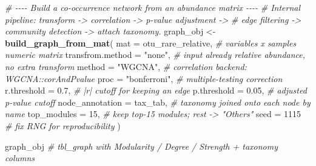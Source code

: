 \documentclass[
]{book}
\newenvironment{Shaded}{\begin{snugshade}}{\end{snugshade}}
\newcommand{\AttributeTok}[1]{\textcolor[rgb]{0.13,0.29,0.53}{#1}}
\newcommand{\CommentTok}[1]{\textcolor[rgb]{0.56,0.35,0.01}{\textit{#1}}}
\newcommand{\DecValTok}[1]{\textcolor[rgb]{0.00,0.00,0.81}{#1}}
\newcommand{\FloatTok}[1]{\textcolor[rgb]{0.00,0.00,0.81}{#1}}
\newcommand{\FunctionTok}[1]{\textcolor[rgb]{0.13,0.29,0.53}{\textbf{#1}}}
\newcommand{\NormalTok}[1]{#1}
\newcommand{\OtherTok}[1]{\textcolor[rgb]{0.56,0.35,0.01}{#1}}
\newcommand{\StringTok}[1]{\textcolor[rgb]{0.31,0.60,0.02}{#1}}
\begin{document}
\begin{Shaded}
\begin{Highlighting}[]
\CommentTok{\# {-}{-}{-}{-} Build a co{-}occurrence network from an abundance matrix {-}{-}{-}{-}}
\CommentTok{\# Internal pipeline: transform {-}\textgreater{} correlation {-}\textgreater{} p{-}value adjustment {-}\textgreater{}}
\CommentTok{\# edge filtering {-}\textgreater{} community detection {-}\textgreater{} attach taxonomy.}
\NormalTok{graph\_obj }\OtherTok{\textless{}{-}} \FunctionTok{build\_graph\_from\_mat}\NormalTok{(}
  \AttributeTok{mat              =}\NormalTok{ otu\_rare\_relative,  }\CommentTok{\# variables x samples numeric matrix}
  \AttributeTok{transfrom.method =} \StringTok{"none"}\NormalTok{,             }\CommentTok{\# input already relative abundance, no extra transform}
  \AttributeTok{method           =} \StringTok{"WGCNA"}\NormalTok{,            }\CommentTok{\# correlation backend: WGCNA::corAndPvalue}
  \AttributeTok{proc             =} \StringTok{"bonferroni"}\NormalTok{,       }\CommentTok{\# multiple{-}testing correction}
  \AttributeTok{r.threshold      =} \FloatTok{0.7}\NormalTok{,                }\CommentTok{\# |r| cutoff for keeping an edge}
  \AttributeTok{p.threshold      =} \FloatTok{0.05}\NormalTok{,               }\CommentTok{\# adjusted p{-}value cutoff}
  \AttributeTok{node\_annotation  =}\NormalTok{ tax\_tab,            }\CommentTok{\# taxonomy joined onto each node by name}
  \AttributeTok{top\_modules      =} \DecValTok{15}\NormalTok{,                 }\CommentTok{\# keep top{-}15 modules; rest {-}\textgreater{} "Others"}
  \AttributeTok{seed             =} \DecValTok{1115}                \CommentTok{\# fix RNG for reproducibility}
\NormalTok{)}

\NormalTok{graph\_obj   }\CommentTok{\# tbl\_graph with Modularity / Degree / Strength + taxonomy columns}
\end{Highlighting}
\end{Shaded}
\end{document}
